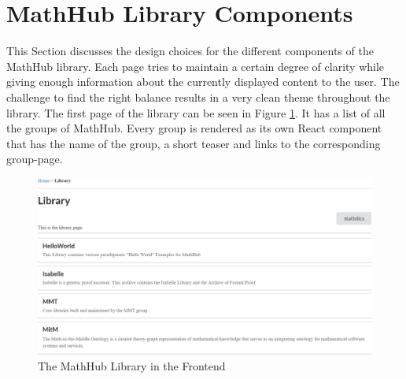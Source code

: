 \documentclass[11pt,a4paper]{article}
\begin{document}
\section{MathHub Library Components} \label{library}
This Section discusses the design choices for the different components of the MathHub library.
Each page tries to maintain a certain degree of clarity while giving enough information about the currently displayed content to the user.
The challenge to find the right balance results in a very clean theme throughout the library.
The first page of the library can be seen in Figure \ref{fig:lib}.
It has a list of all the groups of MathHub.
Every group is rendered as its own React component that has the name of the group, a short teaser and links to the corresponding group-page.
\begin{figure}[H]
  \includegraphics[width=1\textwidth]{library.png}
  \caption{The MathHub Library in the Frontend}
  \label{fig:lib}
\end{figure}
  
\end{document}
